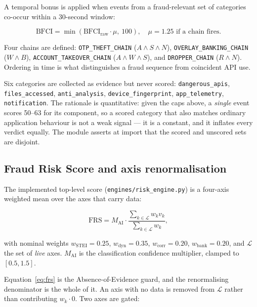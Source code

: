 \documentclass{article}
\begin{document}
A temporal bonus is applied when events from a fraud-relevant set of categories
co-occur within a 30-second window:

\begin{equation}
\mathrm{BFCI} = \min\!\left(\mathrm{BFCI}_{\mathrm{raw}} \cdot \mu,\ 100\right),
\quad \mu = 1.25 \text{ if a chain fires.}
\label{eq:seq}
\end{equation}

Four chains are defined: \texttt{OTP\_THEFT\_CHAIN}
($A \wedge S \wedge N$), \texttt{OVERLAY\_BANKING\_CHAIN}
($W \wedge B$), \texttt{ACCOUNT\_TAKEOVER\_CHAIN} ($A \wedge W \wedge S$), and
\texttt{DROPPER\_CHAIN} ($R \wedge N$). Ordering in time is what distinguishes
a fraud sequence from coincident API use.

Six categories are collected as evidence but never scored:
\texttt{dangerous\_apis}, \texttt{files\_accessed}, \texttt{anti\_analysis},
\texttt{device\_fingerprint}, \texttt{app\_telemetry}, \texttt{notification}.
The rationale is quantitative: given the caps above, a \emph{single} event
scores 50--63 for its component, so a scored category that also matches
ordinary application behaviour is not a weak signal --- it is a constant, and it
inflates every verdict equally. The module asserts at import that the scored and
unscored sets are disjoint.

\subsection{Fraud Risk Score and axis renormalisation}
\label{ssec:frs}

The implemented top-level score (\texttt{engines/risk\_engine.py}) is a
four-axis weighted mean over the axes that carry data:

\begin{equation}
\mathrm{FRS} = M_{\mathrm{AI}} \cdot
\frac{\sum_{k \in \mathcal{L}} w_k v_k}{\sum_{k \in \mathcal{L}} w_k},
\label{eq:frs}
\end{equation}

with nominal weights $w_{\mathrm{STEI}} = 0.25$, $w_{\mathrm{dyn}} = 0.35$,
$w_{\mathrm{corr}} = 0.20$, $w_{\mathrm{bank}} = 0.20$, and $\mathcal{L}$ the
set of \emph{live} axes. $M_{\mathrm{AI}}$ is the classification confidence
multiplier, clamped to $[0.5, 1.5]$.

Equation~\ref{eq:frs} is the Absence-of-Evidence guard, and the renormalising
denominator is the whole of it. An axis with no data is removed from
$\mathcal{L}$ rather than contributing $w_k \cdot 0$. Two axes are gated:
\end{document}
